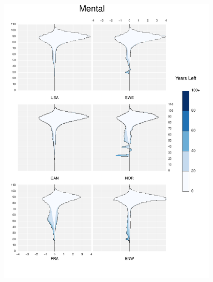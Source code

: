 \documentclass{article}
\begin{document}
\begin{appendices}
\begin{figure}
\includegraphics[scale=.8]{Figures/Causes/DxyMental.pdf}
\end{figure}
\begin{figure}
\centering

\end{figure}
\end{appendices}
\end{document}
